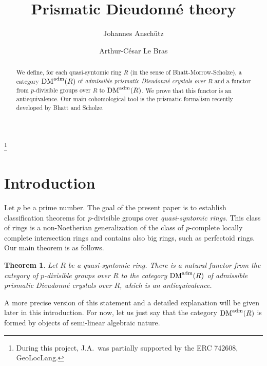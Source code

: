 \documentclass{amsart}
\theoremstyle{plain}
\newtheorem*{thm}{Theorem}
\theoremstyle{definition}
\newcommand{\DM}{\mathrm{DM}}
\newcommand{\purple}[1]{{\color{black} #1}}
\newcommand{\red}[1]{{\color{black} #1}}
\begin{document}
\title{Prismatic Dieudonn\'e theory}

\author{Johannes Ansch\"{u}tz}
\address{Mathematisches Institut, Universit\"at Bonn, Endenicher Allee 60, 53115 Bonn, Deutschland}
\thanks{During this project, J.A.\ was partially supported by the ERC 742608, GeoLocLang.}

\author{Arthur-C\'esar Le Bras}
\address{Universit\'e Sorbonne Paris Nord, LAGA, C.N.R.S., UMR 7539, 93430 Villetaneuse,
France}

\begin{abstract}
We define, for each quasi-syntomic ring $R$ (in the sense of Bhatt-Morrow-Scholze), a category \red{$\DM^{\rm adm}(R)$ of \textit{admissible prismatic Dieudonn\'e crystals over $R$} and a functor from $p$-divisible groups over $R$ to $\DM^{\rm adm}(R)$}. We prove that this functor is an antiequivalence. Our main cohomological tool is the prismatic formalism recently developed by Bhatt and Scholze.
\end{abstract}


\maketitle
\tableofcontents


\newpage



\section{Introduction}
\label{sec:introduction}


Let $p$ be a prime number. The goal of the present paper is to establish classification theorems for $p$-divisible groups over \textit{quasi-syntomic rings}. This class of rings is a non-Noetherian generalization of the class of $p$-complete locally complete intersection rings and contains also big rings, such as perfectoid rings. Our main theorem is as follows.

\begin{thm}
Let $R$ be a quasi-syntomic ring. There is a natural functor from the category of $p$-divisible groups over $R$ to the category \red{$\DM^{\rm adm}(R)$ of admissible} prismatic Dieudonn\'e crystals over $R$, \purple{which is an antiequivalence}.
\end{thm}


A more precise version of this statement and a detailed explanation will be given later in this introduction. For now, let us just say that the category \red{$\DM^{\rm adm}(R)$} is formed by objects of semi-linear algebraic nature. 
\end{document}

